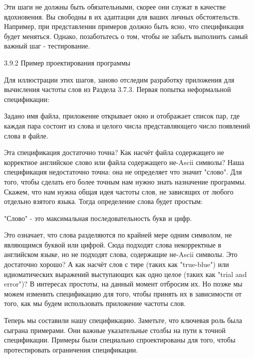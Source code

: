 Эти шаги не должны быть обязательными, скорее они служат в качестве вдохновения. Вы свободны в их адаптации для ваших личных обстоятельств. Например, при представлении примеров должно быть ясно, что спецификация будет меняться. Однако, позаботьтесь о том, чтобы не забыть выполнить самый важный шаг - тестирование.

3.9.2 Пример проектирования программы

Для иллюстрации этих шагов, заново отследим разработку приложения для вычисления частоты слов из Раздела 3.7.3. Первая попытка неформальной спецификации:

Задано имя файла, приложение открывает окно и отображает список пар, где каждая пара состоит из слова и целого числа представляющего число появлений слова в файле.

Эта спецификация достаточно точна? Как насчёт файла содержащего не корректное английское слово или файла содержащего не-Ascii символы? Наша спецификация недостаточно точна: она не определяет что значит "слово". Для того, чтобы сделать его более точным нам нужно знать назначение программы. Скажем, что нам нужна общая идея частоты слов, не зависящих от любого отдельно взятого языка. Тогда определение слова будет простым:

"Слово" - это максимальная последовательность букв и цифр.

Это означает, что слова разделяются по крайней мере одним символом, не являющимся буквой или цифрой. Сюда подходят слова некорректные в английском языке, но не подходят слова, содержащие не-Ascii символы. Это достаточно хорошо? А как насчёт слов с тире (таких как "true-blue") или идиоматических выражений выступающих как одно целое (таких как "trial and error")? В интересах простоты, на данный момент отбросим их. Но позже мы можем изменить спецификацию для того, чтобы принять их в зависимости от того, как мы будем использовать приложение частоты слов.

Теперь мы составили нашу спецификацию. Заметьте, что ключевая роль была сыграна примерами. Они важные указательные столбы на пути к точной спецификации. Примеры были специально спроектированы для того, чтобы протестировать ограничения спецификации.

